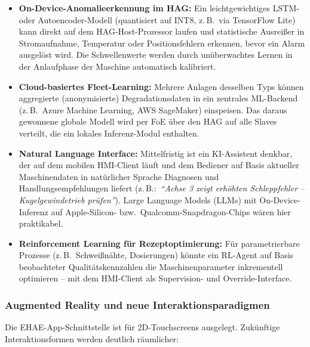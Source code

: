﻿\documentclass[12pt,a4paper]{article}
\begin{document}
\begin{itemize}[leftmargin=2em]
  \item \textbf{On-Device-Anomalieerkennung im HAG:} Ein leichtgewichtiges
    LSTM- oder Autoencoder-Modell (quantisiert auf INT8, z.\,B.\ via TensorFlow
    Lite) kann direkt auf dem HAG-Host-Prozessor laufen und statistische
    Ausreißer in Stromaufnahme, Temperatur oder Positionsfehlern erkennen,
    bevor ein Alarm ausgelöst wird. Die Schwellenwerte werden durch
    unüberwachtes Lernen in der Anlaufphase der Maschine automatisch kalibriert.
  \item \textbf{Cloud-basiertes Fleet-Learning:} Mehrere Anlagen desselben
    Typs können aggregierte (anonymisierte) Degradationsdaten in ein zentrales
    ML-Backend (z.\,B.\ Azure Machine Learning, AWS SageMaker) einspeisen.
    Das daraus gewonnene globale Modell wird per FoE über den HAG auf alle
    Slaves verteilt, die ein lokales Inferenz-Modul enthalten.
  \item \textbf{Natural Language Interface:} Mittelfristig ist ein
    KI-Assistent denkbar, der auf dem mobilen HMI-Client läuft und dem
    Bediener auf Basis aktueller Maschinendaten in natürlicher Sprache
    Diagnosen und Handlungsempfehlungen liefert (z.\,B.:\ \emph{``Achse 3
    zeigt erhöhten Schleppfehler -- Kugelgewindetrieb prüfen''}).
    Large Language Models (LLMs) mit On-Device-Inferenz auf
    Apple-Silicon- bzw.\ Qualcomm-Snapdragon-Chips wären hier praktikabel.
  \item \textbf{Reinforcement Learning für Rezeptoptimierung:} Für
    parametrierbare Prozesse (z.\,B.\ Schweißnähte, Dosierungen) könnte
    ein RL-Agent auf Basis beobachteter Qualitätskennzahlen die
    Maschinenparameter inkrementell optimieren -- mit dem HMI-Client als
    Supervision- und Override-Interface.
\end{itemize}

\subsubsection*{Augmented Reality und neue Interaktionsparadigmen}

Die EHAE-App-Schnittstelle ist für 2D-Touchscreens ausgelegt. Zukünftige
Interaktionsformen werden deutlich räumlicher:
\end{document}
